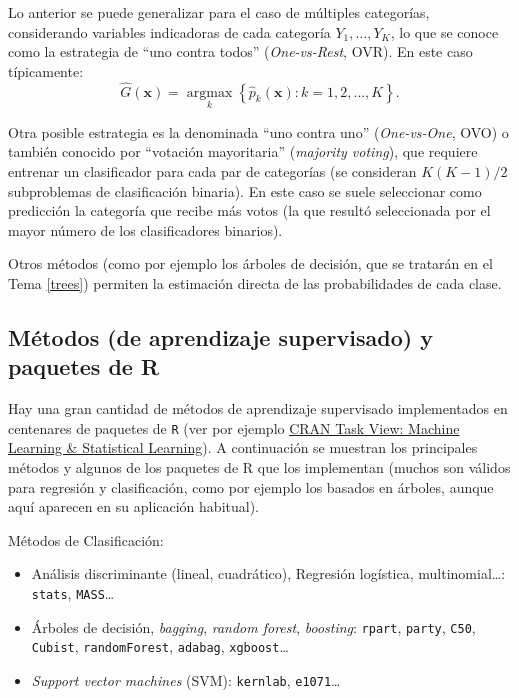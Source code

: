 \documentclass[
  spanish,
]{book}
\theoremstyle{break}
\theoremstyle{definition}
\theoremstyle{definition}
\theoremstyle{definition}
\theoremstyle{definition}
\theoremstyle{remark}
\begin{document}
Lo anterior se puede generalizar para el caso de múltiples categorías, considerando variables indicadoras de cada categoría \(Y_1, \ldots, Y_K\), lo que se conoce como la estrategia de ``uno contra todos'' (\emph{One-vs-Rest}, OVR). En este caso típicamente:
\[\hat G \left(\mathbf{x} \right) = \underset{k}{\operatorname{argmax}} \left\{ \hat p_k(\mathbf{x}) : k = 1, 2, \ldots, K \right\}.\]

Otra posible estrategia es la denominada ``uno contra uno'' (\emph{One-vs-One}, OVO) o también conocido por ``votación mayoritaria'' (\emph{majority voting}), que requiere entrenar un clasificador para cada par de categorías (se consideran \(K(K-1)/2\) subproblemas de clasificación binaria).
En este caso se suele seleccionar como predicción la categoría que recibe más votos (la que resultó seleccionada por el mayor número de los clasificadores binarios).

Otros métodos (como por ejemplo los árboles de decisión, que se tratarán en el Tema \ref{trees}) permiten la estimación directa de las probabilidades de cada clase.

\hypertarget{metodos-pkgs}{%
\subsection{Métodos (de aprendizaje supervisado) y paquetes de R}\label{metodos-pkgs}}

Hay una gran cantidad de métodos de aprendizaje supervisado implementados en centenares de paquetes de \texttt{R} (ver por ejemplo \href{https://cran.r-project.org/web/views/MachineLearning.html}{CRAN Task View: Machine Learning \& Statistical Learning}).
A continuación se muestran los principales métodos y algunos de los paquetes de R que los implementan (muchos son válidos para regresión y clasificación, como por ejemplo los basados en árboles, aunque aquí aparecen en su aplicación habitual).

Métodos de Clasificación:

\begin{itemize}
\item
  Análisis discriminante (lineal, cuadrático), Regresión logística, multinomial\ldots:
  \texttt{stats}, \texttt{MASS}\ldots{}
\item
  Árboles de decisión, \emph{bagging}, \emph{random forest}, \emph{boosting}:
  \texttt{rpart}, \texttt{party}, \texttt{C50}, \texttt{Cubist}, \texttt{randomForest}, \texttt{adabag}, \texttt{xgboost}\ldots{}
\item
  \emph{Support vector machines} (SVM):
  \texttt{kernlab}, \texttt{e1071}\ldots{}
\end{itemize}
\end{document}

